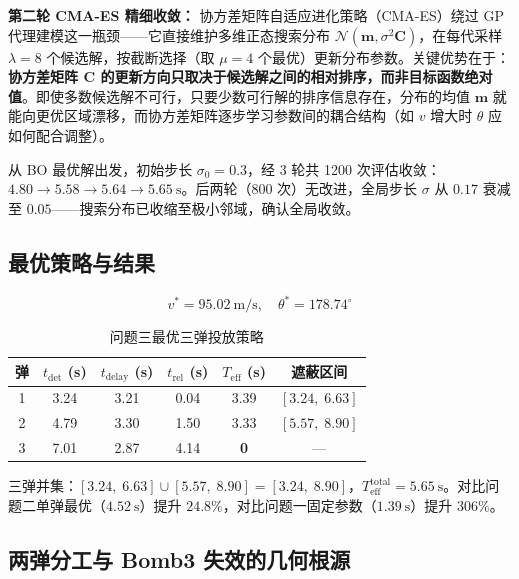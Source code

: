 \documentclass{ctexart}
\begin{document}
\textbf{第二轮 CMA-ES 精细收敛：} 协方差矩阵自适应进化策略（CMA-ES）绕过 GP 代理建模这一瓶颈——它直接维护多维正态搜索分布 $\mathcal{N}(\mathbf{m},\sigma^2\mathbf{C})$，在每代采样 $\lambda=8$ 个候选解，按截断选择（取 $\mu=4$ 个最优）更新分布参数。关键优势在于：\textbf{协方差矩阵 $\mathbf{C}$ 的更新方向只取决于候选解之间的相对排序，而非目标函数绝对值}。即使多数候选解不可行，只要少数可行解的排序信息存在，分布的均值 $\mathbf{m}$ 就能向更优区域漂移，而协方差矩阵逐步学习参数间的耦合结构（如 $v$ 增大时 $\theta$ 应如何配合调整）。

从 BO 最优解出发，初始步长 $\sigma_0=0.3$，经 3 轮共 1200 次评估收敛：$4.80 \to 5.58 \to 5.64 \to 5.65\ \mathrm{s}$。后两轮（800 次）无改进，全局步长 $\sigma$ 从 $0.17$ 衰减至 $0.05$——搜索分布已收缩至极小邻域，确认全局收敛。

\subsection{最优策略与结果}

\begin{equation}
\boxed{v^* = 95.02\ \mathrm{m/s},\quad \theta^* = 178.74^\circ}
\end{equation}

\begin{table}[H]
\centering
\caption{问题三最优三弹投放策略}
\label{tab:p3-strategy}
\begin{tabular}{c|c|c|c|c|c}
\toprule
\textbf{弹} & $t_{\text{det}}$ (s) & $t_{\text{delay}}$ (s) & $t_{\text{rel}}$ (s) & $T_{\text{eff}}$ (s) & \textbf{遮蔽区间} \\
\midrule
1 & 3.24 & 3.21 & 0.04 & 3.39 & $[3.24,\; 6.63]$ \\
2 & 4.79 & 3.30 & 1.50 & 3.33 & $[5.57,\; 8.90]$ \\
3 & 7.01 & 2.87 & 4.14 & \textbf{0} & — \\
\bottomrule
\end{tabular}
\end{table}

三弹并集：$[3.24,\; 6.63] \cup [5.57,\; 8.90] = [3.24,\; 8.90]$，$T_{\text{eff}}^{\text{total}} = 5.65\ \mathrm{s}$。对比问题二单弹最优（$4.52\ \mathrm{s}$）提升 $24.8\%$，对比问题一固定参数（$1.39\ \mathrm{s}$）提升 $306\%$。

\subsection{两弹分工与 Bomb3 失效的几何根源}
\end{document}
